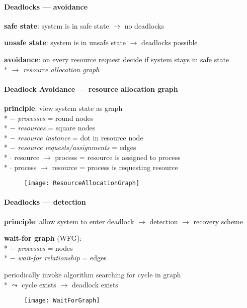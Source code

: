 \paragraph{Deadlocks --- avoidance}
\begin{items}
  \item \textbf{safe state}: system is in safe state $ \to $ no deadlocks
  \item \textbf{unsafe state}: system is in unsafe state $ \to $ deadlocks possible
  \item \textbf{avoidance}: on every resource request decide if system stays in safe state \\*
    $ \to $ \emph{resource allocation graph}
\end{items}

\paragraph{Deadlock Avoidance --- resource allocation graph}
\begin{items}
  \item \textbf{principle}: view system state as graph \\*
    $ - $ \emph{processes} = round nodes \\*
    $ - $ \emph{resources} = square nodes \\*
    $ - $ \emph{resource instance} = dot in resource node \\*
    $ - $ \emph{resource requests/assignments} = edges \\*
    \phantom{$ - $} $ \cdot $ resource $ \to $ process = resource is assigned to process \\*
    \phantom{$ - $} $ \cdot $ process $ \to $ resource = process is requesting resource
  \begin{figure}[H]\centering\label{ResourceAllocationGraph}\texttt{[image: ResourceAllocationGraph]}\end{figure}
\end{items}

\paragraph{Deadlocks --- detection}
\begin{items}
  \item \textbf{principle}: allow system to enter deadlock $ \to $ detection $ \to $ recovery scheme
  \item \textbf{wait-for graph} (WFG): \\*
    $ - $ \emph{processes} = nodes \\*
    $ - $ \emph{wait-for relationship} = edges
  \item periodically invoke algorithm searching for cycle in graph \\*
    $ \leadsto $ cycle exists $ \to $ deadlock exists
\end{items}
\begin{figure}[H]\centering\label{WaitForGraph}\texttt{[image: WaitForGraph]}\end{figure}

